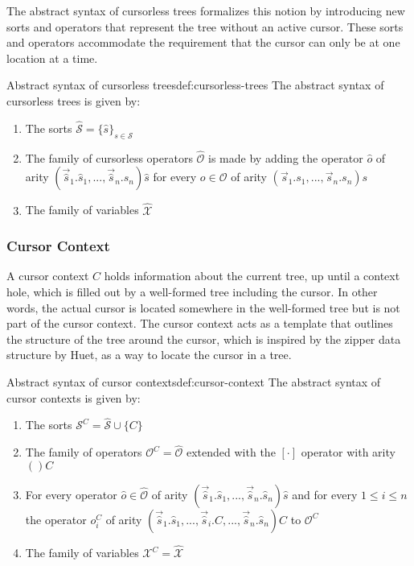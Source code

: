 The abstract syntax of cursorless trees formalizes this notion by introducing new sorts and operators that represent the tree without an active cursor. These sorts and operators accommodate the requirement that the cursor can only be at one location at a time.

\begin{definition}{Abstract syntax of cursorless trees}{def:cursorless-trees}
    The abstract syntax of cursorless trees is given by:
    \begin{enumerate}
        \item The sorts $\hat{\mathcal{S}} = \{ \hat{s} \}_{s \in \mathcal{S}}$
        \item The family of cursorless operators $\hat{\mathcal{O}}$ is made by adding
              the operator $\hat{o}$ of arity
              $(\vec{\hat{s}}_1.\hat{s}_1,...,\vec{\hat{s}}_n.\hat{s}_n)\hat{s}$
              for every $o \in \mathcal{O}$ of arity $(\vec{s}_1.s_1,...,\vec{s}_n.s_n)s$
        \item The family of variables $\hat{\mathcal{X}}$
    \end{enumerate}
\end{definition}

\subsubsection{Cursor Context}
\label{subsubsec:cursor-context}
A cursor context $C$ holds information about the current tree, up until
a context hole, which is filled out by a well-formed tree including the cursor.
In other words, the actual cursor is located somewhere in the well-formed tree but is not part of the cursor context.
The cursor context acts as a template that outlines the structure of the tree around the cursor, which is inspired by the zipper data structure by Huet\cite{zipper}, as a way to locate the cursor in a tree.

\begin{definition}{Abstract syntax of cursor contexts}{def:cursor-context}
    The abstract syntax of cursor contexts is given by:
    \begin{enumerate}
        \item The sorts $\mathcal{S}^C = \hat{\mathcal{S}} \cup \{C\}$
        \item The family of operators $\mathcal{O}^C = \hat{\mathcal{O}}$ extended with the $[\cdot]$ operator with arity $()C$
        \item For every operator $\hat{o} \in \hat{\mathcal{O}}$ of arity $(\vec{\hat{s}}_1.\hat{s}_1,...,\vec{\hat{s}}_n.\hat{s}_n)\hat{s}$ and for every $1 \leq i \leq n$ the operator $o_i^C$ of arity $(\vec{\hat{s}}_1.\hat{s}_1,...,\vec{\hat{s}}_i.C,...,\vec{\hat{s}}_n.\hat{s}_n)C$ to $\mathcal{O}^C$
        \item The family of variables $\mathcal{X}^C = \hat{\mathcal{X}}$
    \end{enumerate}
\end{definition}

